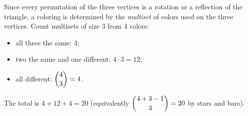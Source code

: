 Since every permutation of the three vertices is a rotation or a reflection of the triangle, a coloring is determined by the \emph{multiset} of colors used on the three vertices. Count multisets of size $3$ from $4$ colors:
\begin{itemize}
\item all three the same: $4$;
\item two the same and one different: $4\cdot3=12$;
\item all different: $\dbinom43=4$.
\end{itemize}
The total is $4+12+4=\boxed{20}$ (equivalently $\dbinom{4+3-1}{3}=20$ by stars and bars).
